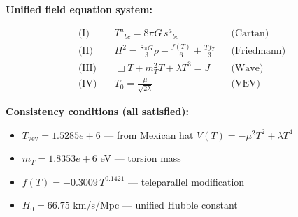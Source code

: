 
\textbf{Unified field equation system:}

\begin{align}
  \text{(I)} \quad & T^a{}_{bc} = 8\pi G \, s^a{}_{bc} && \text{(Cartan)} \\
  \text{(II)} \quad & H^2 = \frac{8\pi G}{3}\rho - \frac{f(T)}{6} + \frac{Tf_T}{3} && \text{(Friedmann)} \\
  \text{(III)} \quad & \Box T + m_T^2 T + \lambda T^3 = J && \text{(Wave)} \\
  \text{(IV)} \quad & T_0 = \frac{\mu}{\sqrt{2\lambda}} && \text{(VEV)}
\end{align}

\textbf{Consistency conditions (all satisfied):}
\begin{itemize}
  \item $T_{\text{vev}} = 1.5285e+6$ — from Mexican hat $V(T) = -\mu^2 T^2 + \lambda T^4$
  \item $m_T = 1.8353e+6$ eV — torsion mass
  \item $f(T) = -0.3009 \, T^{0.1421}$ — teleparallel modification
  \item $H_0 = 66.75$ km/s/Mpc — unified Hubble constant
\end{itemize}
